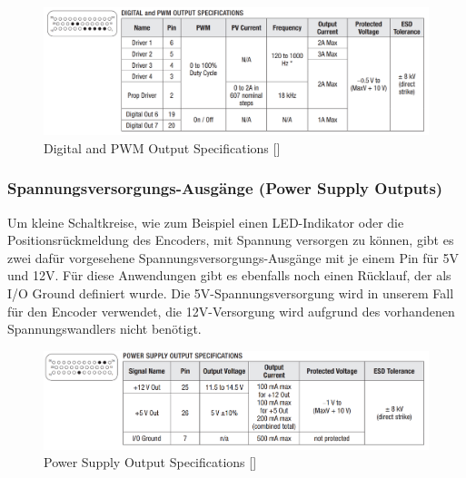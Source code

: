 \begin{figure}[H]
	\begin{center}
		\includegraphics[width=\textwidth]{figures/antrieb/Digital_PWM_Output_Specifications.png}
		\caption{Digital and PWM Output Specifications [\cite{Manual}]}
	\end{center}
\end{figure}



\subsubsection{Spannungsversorgungs-Ausgänge (Power Supply Outputs)}
\label{Versorgungs_Ausgaenge}
Um kleine Schaltkreise, wie zum Beispiel einen LED-Indikator oder die Positionsrückmeldung des Encoders, mit Spannung versorgen zu können, gibt es zwei dafür vorgesehene Spannungsversorgungs-Ausgänge mit je einem Pin für 5V und 12V. Für diese Anwendungen gibt es ebenfalls noch einen Rücklauf, der als I/O Ground definiert wurde. Die 5V-Spannungsversorgung wird in unserem Fall für den Encoder verwendet, die 12V-Versorgung wird aufgrund des vorhandenen Spannungswandlers nicht benötigt.

\begin{figure}[H]
	\begin{center}
		\includegraphics[width=\textwidth]{figures/antrieb/Power_Supply_Output_Specifications.png}
		\caption{Power Supply Output Specifications [\cite{Manual}]}
	\end{center}
\end{figure}


